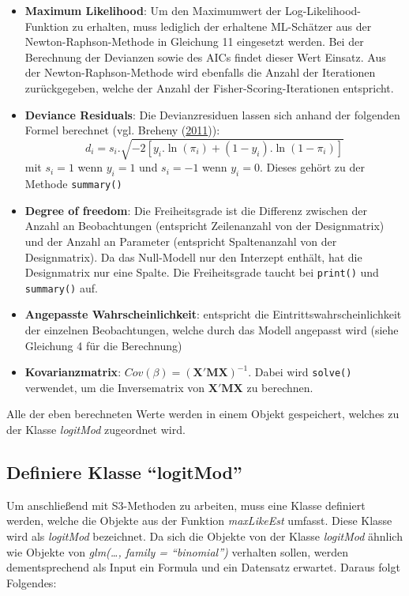 \documentclass[12pt,]{article}
\begin{document}
\begin{itemize}
\item
  \textbf{Maximum Likelihood}: Um den Maximumwert der
  Log-Likelihood-Funktion zu erhalten, muss lediglich der erhaltene
  ML-Schätzer aus der Newton-Raphson-Methode in Gleichung 11 eingesetzt
  werden. Bei der Berechnung der Devianzen sowie des AICs findet dieser
  Wert Einsatz. Aus der Newton-Raphson-Methode wird ebenfalls die Anzahl
  der Iterationen zurückgegeben, welche der Anzahl der
  Fisher-Scoring-Iterationen entspricht.
\item
  \textbf{Deviance Residuals}: Die Devianzresiduen lassen sich anhand
  der folgenden Formel berechnet (vgl. Breheny
  (\protect\hyperlink{ref-breheny11}{2011})): \[
  d_i = s_i.\sqrt{-2[y_i.\ln(\pi_i) + (1 - y_i).\ln(1 - \pi_i)]}
  \] mit \(s_i = 1\) wenn \(y_i = 1\) und \(s_i = -1\) wenn \(y_i = 0\).
  Dieses gehört zu der Methode \texttt{summary()}
\item
  \textbf{Degree of freedom}: Die Freiheitsgrade ist die Differenz
  zwischen der Anzahl an Beobachtungen (entspricht Zeilenanzahl von der
  Designmatrix) und der Anzahl an Parameter (entspricht Spaltenanzahl
  von der Designmatrix). Da das Null-Modell nur den Interzept enthält,
  hat die Designmatrix nur eine Spalte. Die Freiheitsgrade taucht bei
  \texttt{print()} und \texttt{summary()} auf.
\item
  \textbf{Angepasste Wahrscheinlichkeit}: entspricht die
  Eintrittswahrscheinlichkeit der einzelnen Beobachtungen, welche durch
  das Modell angepasst wird (siehe Gleichung 4 für die Berechnung)
\item
  \textbf{Kovarianzmatrix}: \(Cov(\beta) = (\mathbf{X'MX})^{-1}\). Dabei
  wird \texttt{solve()} verwendet, um die Inversematrix von
  \(\mathbf{X'MX}\) zu berechnen.
\end{itemize}

Alle der eben berechneten Werte werden in einem Objekt gespeichert,
welches zu der Klasse \emph{logitMod} zugeordnet wird.

\subsection{\texorpdfstring{Definiere Klasse
``logitMod''}{Definiere Klasse logitMod}}\label{definiere-klasse-logitmod}

Um anschließend mit S3-Methoden zu arbeiten, muss eine Klasse definiert
werden, welche die Objekte aus der Funktion \emph{maxLikeEst} umfasst.
Diese Klasse wird als \emph{logitMod} bezeichnet. Da sich die Objekte
von der Klasse \emph{logitMod} ähnlich wie Objekte von
\emph{glm(\ldots{}, family = ``binomial'')} verhalten sollen, werden
dementsprechend als Input ein Formula und ein Datensatz erwartet. Daraus
folgt Folgendes:
\end{document}
